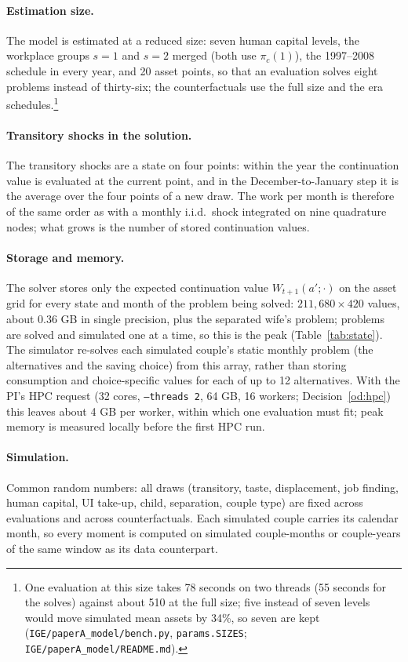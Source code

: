 \documentclass[11pt]{article}
\newcommand{\code}[1]{\texttt{#1}}
\newcommand{\1}{\mathbf{1}}
\begin{document}
\paragraph{Estimation size.} The model is estimated at a reduced size: seven human capital levels, the workplace groups
$s = 1$ and $s = 2$ merged (both use $\pi_c(1)$), the 1997--2008 schedule in every year, and 20 asset points, so that an
evaluation solves eight problems instead of thirty-six; the counterfactuals use the full size and the era
schedules.\footnote{One evaluation at this size takes 78 seconds on two threads (55 seconds for the solves) against
about 510 at the full size; five instead of seven levels would move simulated mean assets by 34\%, so seven are kept
(\code{IGE/paperA\_model/bench.py}, \code{params.SIZES}; \code{IGE/paperA\_model/README.md}).}

\paragraph{Transitory shocks in the solution.} The transitory shocks are a state on four points: within the year
the continuation value is evaluated at the current point, and in the December-to-January step it is the average over
the four points of a new draw. The work per month is therefore of the same order as with a monthly i.i.d.\ shock
integrated on nine quadrature nodes; what grows is the number of stored continuation values.

\paragraph{Storage and memory.} The solver stores only the expected continuation value $W_{t+1}(a'; \cdot)$ on the
asset grid for every state and month of the problem being solved: $211{,}680 \times 420$ values, about 0.36 GB in single
precision, plus the separated wife's problem; problems are solved and simulated one at a time, so this is the peak
(Table~\ref{tab:state}). The simulator re-solves each simulated couple's static monthly problem (the alternatives and
the saving choice) from this array, rather than storing consumption and choice-specific values for each of up to 12
alternatives. With the PI's HPC request (32 cores, \code{--threads 2}, 64 GB, 16 workers; Decision~\ref{od:hpc}) this
leaves about 4 GB per worker, within which one evaluation must fit; peak memory is measured locally before the first HPC
run.

\paragraph{Simulation.} Common random numbers: all draws (transitory, taste, displacement, job finding, human capital,
UI take-up, child, separation, couple type) are fixed across evaluations and across counterfactuals. Each simulated
couple carries its calendar month, so every moment is computed on simulated couple-months or couple-years of the same
window as its data counterpart.
\end{document}
